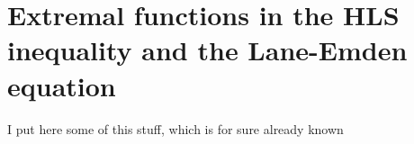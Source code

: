 \documentclass[11pt,a4paper]{article}
\numberwithin{equation}{section}
\theoremstyle{plain}
\theoremstyle{remark}
\begin{document}






\appendix
\iffalse
\section{Extremal functions in the HLS inequality and the Lane-Emden equation}

{\color{red} I put here some of this stuff, which is for sure already known}
\end{document}
